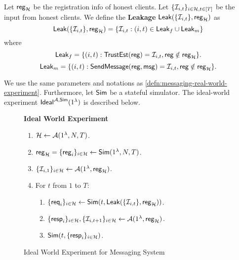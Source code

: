 \begin{definition}
\label{defn:messaging-leakage}
Let $\mathsf{reg}_{\mathcal{H}}$ be the registration info of honest clients. Let $\{\mathcal{I}_{i, t}\}_{i \in \mathcal{H}, t \in [T]}$ be the input from honest clients. We define the \textbf{Leakage} $\mathsf{Leak}(\{\mathcal{I}_{i, t}\}, \mathsf{reg}_{\mathcal{H}})$ as
$$\mathsf{Leak}(\{\mathcal{I}_{i, t}\}, \mathsf{reg}_{\mathcal{H}}) = \{\mathcal{I}_{i, t}: (i, t) \in \mathsf{Leak}_f \cup \mathsf{Leak}_m\}$$
where
$$\mathsf{Leak}_f = \{(i, t): \mathsf{TrustEst}(\mathsf{reg}) = \mathcal{I}_{i, t}, \mathsf{reg} \notin \mathsf{reg}_{\mathcal{H}}\}.$$
$$\mathsf{Leak}_m = \{(i, t): \mathsf{SendMessage}(\mathsf{reg}, \mathsf{msg}) = \mathcal{I}_{i, t}, \mathsf{reg} \notin \mathsf{reg}_{\mathcal{H}}\}.$$
\end{definition}
\begin{definition}
\label{defn:messaging-ideal-world-experiment}
We use the same parameters and notations as \cref{defn:messaging-real-world-experiment}. Furthermore, let $\mathsf{Sim}$ be a stateful simulator. The ideal-world experiment $\mathsf{Ideal}^{\mathcal{A}, \mathsf{Sim}}(1^{\lambda})$ is described below.
\begin{figure}[h]
\begin{framed}
\textbf{Ideal World Experiment}
\begin{enumerate}
\item $\mathcal{H} \leftarrow \mathcal{A}(1^{\lambda}, N, T)$.
\item $\mathsf{reg}_{\mathcal{H}} = \{\mathsf{reg}_i\}_{i \in \mathcal{H}} \leftarrow \mathsf{Sim}(1^{\lambda}, N, T)$. 
\item $\{\mathcal{I}_{i, 1}\}_{i \in \mathcal{H}} \leftarrow \mathcal{A}(1^{\lambda}, \mathsf{reg}_{\mathcal{H}})$.
\item For $t$ from $1$ to $T$:
    \begin{enumerate}
    \item  $\{\mathsf{req}_i\}_{i \in \mathcal{H}} \leftarrow \mathsf{Sim}(t, \mathsf{Leak}(\{\mathcal{I}_{i, t}\}, \mathsf{reg}_{\mathcal{H}}))$.
    
    \item $\{\mathsf{resp}_i\}_{i \in \mathcal{H}}, \{\mathcal{I}_{i, t + 1}\}_{i \in \mathcal{H}} \leftarrow \mathcal{A}(1^{\lambda}, \mathsf{reg}_{\mathcal{H}})$.
    
    \item $\mathsf{Sim}(t, \{\mathsf{resp}_i\}_{i \in \mathcal{H}})$.
    \end{enumerate}
\end{enumerate}
\end{framed}
\caption{Ideal World Experiment for Messaging System}
\label{expr:messaging-ideal-world}
\end{figure}

\end{definition}

